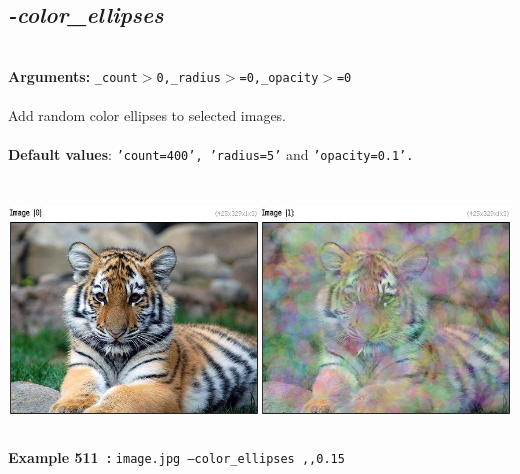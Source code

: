 \documentclass[a4paper,11pt,twoside]{book}
\begin{document}
\subsection{\emph{-color\_ellipses} }\vspace*{-0.5em}
~\\\textbf{Arguments: } 
{\small \texttt{\_count$>$0,\_radius$>$=0,\_opacity$>$=0}}\\~\\
Add random color ellipses to selected images.
~\\~\\\textbf{Default values}: {\small \texttt{'count=400', 'radius=5'} and \texttt{'opacity=0.1'.}}
\begin{center}\includegraphics[keepaspectratio=true,height=7cm,width=\textwidth]{img/gmic_def511.jpg}\\
{\footnotesize \textbf{Example 511~:} \texttt{image.jpg --color\_ellipses ,,0.15}}
\end{center}
\end{document}
